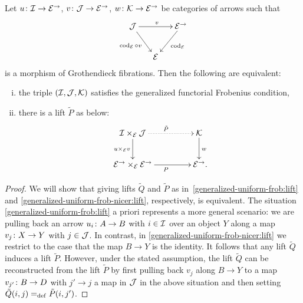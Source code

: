\documentclass[reqno,10pt,a4paper,oneside,draft]{amsart}
\begin{document}
{{\begin{proposition} \label{generalized-uniform-frob-nicer}
Let $u \co \cal{I} \to \cal{E}^\to$, $v \co \cal{J} \to \cal{E}^\to$, $w \co \cal{K} \to \cal{E}^\to$ be categories of arrows such that
\begin{equation} \label{uniform-frob:comprehension}
\begin{gathered}
\xymatrix@C-1em{
  \cal{J}
  \ar[rr]^{v}
  \ar[dr]_{\cod_{\cal{E}} \cc v}
&&
  \cal{E}^\to
  \ar[dl]^{\cod_{\cal{E}}}
\\&
  \cal{E}
}
\end{gathered}
\end{equation}
is a morphism of Grothendieck fibrations.
Then the following are equivalent:
\begin{enumerate}[(i)]
\item the triple $(\cal{I}, \cal{J}, \cal{K})$ satisfies the generalized functorial Frobenius condition,
\item there is a lift $\tilde{P}$ as below:
\begin{equation} \label{generalized-uniform-frob-nicer:lift}
\begin{gathered}
\xymatrix@C+2em{
  \cal{I} \times_{\cal{E}} \cal{J}
  \ar@{.>}[r]^{\tilde{P}}
  \ar[d]_{u \times_{\cal{E}} v}
&
  \cal{K}
  \ar[d]^{w}
\\
  \cal{E}^\to \times_{\cal{E}} \cal{E}^\to
  \ar[r]_{P}
&
  \cal{E}^\to
\rlap{.}}
\end{gathered}
\end{equation}
\end{enumerate}
\end{proposition}

\begin{proof}
We will show that giving lifts $\tilde{Q}$ and $\tilde{P}$ as in~\eqref{generalized-uniform-frob:lift} and \eqref{generalized-uniform-frob-nicer:lift}, respectively, is equivalent.
The situation \eqref{generalized-uniform-frob:lift} a priori represents a more general scenario: we are pulling back an arrow $u_i \co A \to B$ with $i \in \cal{I}$ over an object $Y$ along a map $v_j \co X \to Y$ with $j \in \cal{J}$.
In contrast, in \eqref{generalized-uniform-frob-nicer:lift} we restrict to the case that the map $B \to Y$ is the identity.
It follows that any lift $\tilde{Q}$ induces a lift $\tilde{P}$.
However, under the stated assumption, the lift $\tilde{Q}$ can be reconstructed from the lift $\tilde{P}$ by first pulling back $v_j$ along $B \to Y$ to a map $v_{j'} \co B \to D$ with $j' \to j$ a map in $\cal{J}$ in the above situation and then setting $\tilde{Q}(i, j) \defeq \tilde{P}(i, j')$.
\end{proof}

}}
\end{document}
